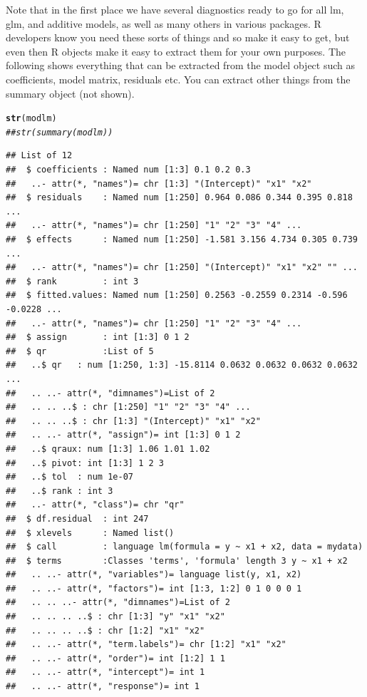 \documentclass[english,nohyper,titlepage]{tufte-handout}\usepackage[]{graphicx}\usepackage[]{color}
\makeatletter
\newcommand{\hlcom}[1]{\textcolor[rgb]{0.678,0.584,0.686}{\textit{#1}}}%
\newcommand{\hlstd}[1]{\textcolor[rgb]{0.345,0.345,0.345}{#1}}%
\newcommand{\hlkwd}[1]{\textcolor[rgb]{0.737,0.353,0.396}{\textbf{#1}}}%
\newenvironment{kframe}{%
 \def\at@end@of@kframe{}%
 \ifinner\ifhmode%
  \def\at@end@of@kframe{\end{minipage}}%
  \begin{minipage}{\columnwidth}%
 \fi\fi%
 \def\FrameCommand##1{\hskip\@totalleftmargin \hskip-\fboxsep
 \colorbox{shadecolor}{##1}\hskip-\fboxsep
     \hskip-\linewidth \hskip-\@totalleftmargin \hskip\columnwidth}%
 \MakeFramed {\advance\hsize-\width
   \@totalleftmargin\z@ \linewidth\hsize
   \@setminipage}}%
 {\par\unskip\endMakeFramed%
 \at@end@of@kframe}
\newenvironment{knitrout}{}{} %
\makeatother
\begin{document}
Note that in the first place we have several diagnostics ready to go for all lm, glm, and additive models, as well as many others in various packages. R developers know you need these sorts of things and so make it easy to get, but even then R objects make it easy to extract them for your own purposes.  The following shows everything that can be extracted from the model object such as coefficients, model matrix, residuals etc.  You can extract other things from the summary object (not shown).

\begin{knitrout}\tiny
{}\color{fgcolor}\begin{kframe}
\begin{alltt}
\hlkwd{str}\hlstd{(modlm)}
\hlcom{## str(summary(modlm))}
\end{alltt}
\begin{verbatim}
## List of 12
##  $ coefficients : Named num [1:3] 0.1 0.2 0.3
##   ..- attr(*, "names")= chr [1:3] "(Intercept)" "x1" "x2"
##  $ residuals    : Named num [1:250] 0.964 0.086 0.344 0.395 0.818 ...
##   ..- attr(*, "names")= chr [1:250] "1" "2" "3" "4" ...
##  $ effects      : Named num [1:250] -1.581 3.156 4.734 0.305 0.739 ...
##   ..- attr(*, "names")= chr [1:250] "(Intercept)" "x1" "x2" "" ...
##  $ rank         : int 3
##  $ fitted.values: Named num [1:250] 0.2563 -0.2559 0.2314 -0.596 -0.0228 ...
##   ..- attr(*, "names")= chr [1:250] "1" "2" "3" "4" ...
##  $ assign       : int [1:3] 0 1 2
##  $ qr           :List of 5
##   ..$ qr   : num [1:250, 1:3] -15.8114 0.0632 0.0632 0.0632 0.0632 ...
##   .. ..- attr(*, "dimnames")=List of 2
##   .. .. ..$ : chr [1:250] "1" "2" "3" "4" ...
##   .. .. ..$ : chr [1:3] "(Intercept)" "x1" "x2"
##   .. ..- attr(*, "assign")= int [1:3] 0 1 2
##   ..$ qraux: num [1:3] 1.06 1.01 1.02
##   ..$ pivot: int [1:3] 1 2 3
##   ..$ tol  : num 1e-07
##   ..$ rank : int 3
##   ..- attr(*, "class")= chr "qr"
##  $ df.residual  : int 247
##  $ xlevels      : Named list()
##  $ call         : language lm(formula = y ~ x1 + x2, data = mydata)
##  $ terms        :Classes 'terms', 'formula' length 3 y ~ x1 + x2
##   .. ..- attr(*, "variables")= language list(y, x1, x2)
##   .. ..- attr(*, "factors")= int [1:3, 1:2] 0 1 0 0 0 1
##   .. .. ..- attr(*, "dimnames")=List of 2
##   .. .. .. ..$ : chr [1:3] "y" "x1" "x2"
##   .. .. .. ..$ : chr [1:2] "x1" "x2"
##   .. ..- attr(*, "term.labels")= chr [1:2] "x1" "x2"
##   .. ..- attr(*, "order")= int [1:2] 1 1
##   .. ..- attr(*, "intercept")= int 1
##   .. ..- attr(*, "response")= int 1

\end{verbatim}
\end{kframe}
\end{knitrout}
\end{document}
